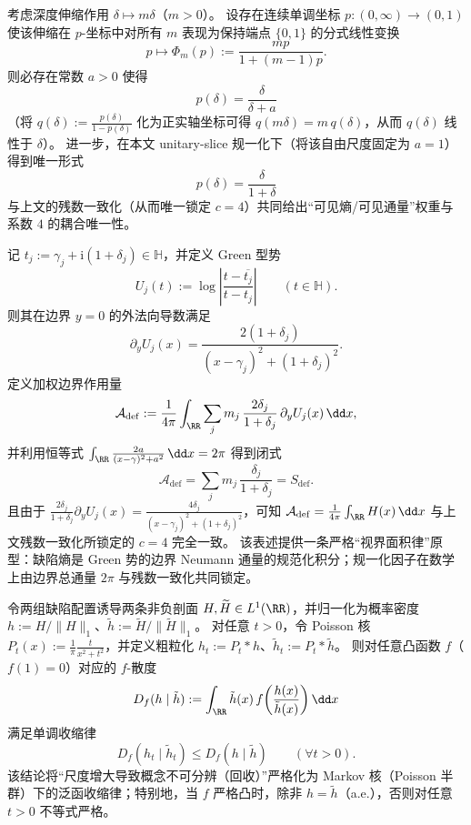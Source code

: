 \begin{proposition}[深度权重的唯一性：乘法伸缩半群的 Möbius 线性化强制 \texorpdfstring{$p(\delta)=\delta/(1+\delta)$}{p(delta)=delta/(1+delta)}]
考虑深度伸缩作用 \(\delta\mapsto m\delta\)（\(m>0\)）。
设存在连续单调坐标 \(p:(0,\infty)\to(0,1)\) 使该伸缩在 \(p\)-坐标中对所有 \(m\) 表现为保持端点 \(\{0,1\}\) 的分式线性变换
\[
p\longmapsto \Phi_m(p):=\frac{m p}{1+(m-1)p}.
\]
则必存在常数 \(a>0\) 使得
\[
\boxed{\;
p(\delta)=\frac{\delta}{\delta+a}\;}
\]
（将 \(q(\delta):=\frac{p(\delta)}{1-p(\delta)}\) 化为正实轴坐标可得 \(q(m\delta)=m\,q(\delta)\)，从而 \(q(\delta)\) 线性于 \(\delta\)）。
进一步，在本文 unitary-slice 规一化下（将该自由尺度固定为 \(a=1\)）得到唯一形式
\[
\boxed{\;
p(\delta)=\frac{\delta}{1+\delta}\;}
\]
与上文的残数一致化（从而唯一锁定 \(c=4\)）共同给出“可见熵/可见通量”权重与系数 \(4\) 的耦合唯一性。
\end{proposition}

\begin{proposition}
记 \(t_j:=\gamma_j+\mathrm{i}(1+\delta_j)\in\mathbb{H}\)，并定义 Green 型势
\[
U_j(t):=\log\left|\frac{t-\overline{t_j}}{t-t_j}\right|
\qquad(t\in\mathbb{H}).
\]
则其在边界 \(y=0\) 的外法向导数满足
\[
\partial_y U_j(x)=\frac{2(1+\delta_j)}{(x-\gamma_j)^2+(1+\delta_j)^2}.
\]
定义加权边界作用量
\[
\mathcal{A}_{\mathrm{def}}
:=\frac{1}{4\pi}\int_{\RR}\sum_{j}m_j\,\frac{2\delta_j}{1+\delta_j}\,\partial_y U_j(x)\,\dd x,
\]
并利用恒等式
\(
\int_{\RR}\frac{2a}{(x-\gamma)^2+a^2}\,\dd x=2\pi
 \)
得到闭式
\[
\boxed{\;
\mathcal{A}_{\mathrm{def}}
=\sum_{j}m_j\,\frac{\delta_j}{1+\delta_j}
=S_{\mathrm{def}}.\;}
\]
且由于
\(
\frac{2\delta_j}{1+\delta_j}\partial_y U_j(x)=\frac{4\delta_j}{(x-\gamma_j)^2+(1+\delta_j)^2}
 \)，可知 \(\mathcal{A}_{\mathrm{def}}=\frac{1}{4\pi}\int_{\RR}H(x)\,\dd x\) 与上文残数一致化所锁定的 \(c=4\) 完全一致。
该表述提供一条严格“视界面积律”原型：缺陷熵是 Green 势的边界 Neumann 通量的规范化积分；规一化因子在数学上由边界总通量 \(2\pi\) 与残数一致化共同锁定。
\end{proposition}

\begin{proposition}
令两组缺陷配置诱导两条非负剖面 \(H,\widetilde H\in L^{1}(\RR)\)，并归一化为概率密度
\(
h:=H/\|H\|_{1}
 \)、\(
\tilde h:=\widetilde H/\|\widetilde H\|_{1}
 \)。
对任意 \(t>0\)，令 Poisson 核 \(P_t(x):=\frac{1}{\pi}\frac{t}{x^{2}+t^{2}}\)，并定义粗粒化
\(
h_t:=P_t*h
 \)、\(
\tilde h_t:=P_t*\tilde h
 \)。
则对任意凸函数 \(f\)（\(f(1)=0\)）对应的 \(f\)-散度
\[
D_f(h\mid \tilde h):=\int_{\RR}\tilde h(x)\,f\!\left(\frac{h(x)}{\tilde h(x)}\right)\dd x
\]
满足单调收缩律
\[
\boxed{\;
D_f(h_t\mid \tilde h_t)\le D_f(h\mid \tilde h)\qquad(\forall t>0).\;}
\]
该结论将“尺度增大导致概念不可分辨（回收）”严格化为 Markov 核（Poisson 半群）下的泛函收缩律；特别地，当 \(f\) 严格凸时，除非 \(h=\tilde h\)（a.e.），否则对任意 \(t>0\) 不等式严格。
\end{proposition}

